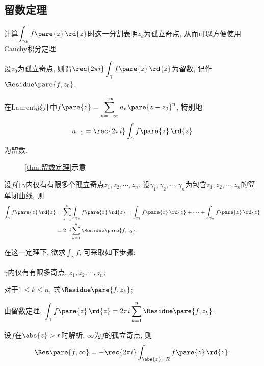\documentclass[../ComplexVariable.tex]{subfiles}
\begin{document}

\subsection{留数定理} %
\label{sub:留数定理}

计算$\displaystyle \int_{\gamma_k}f\pare{z}\,\rd{z}$时这一分割表明$z_k$为孤立奇点, 从而可以方便使用Cauchy积分定理.
\begin{definition}
    设$z_0$为孤立奇点, 则谓$\displaystyle \rec{2\pi i}\int_\gamma f\pare{z}\,\rd{z}$为留数, 记作$\Residue\pare{f,z_0}$.
\end{definition}
\begin{remark}
    在Laurent展开中$\displaystyle f\pare{z} = \sum_{n=-\infty}^{+\infty} a_n\pare{z-z_0}^n$, 特别地
    \[ a_{-1} = \rec{2\pi i} \int_{\gamma} f\pare{z}\,\rd{z} \]
    为留数.
\end{remark}
\begin{figure}[ht]
    \centering
    \caption{\cref{thm:留数定理}示意}
\end{figure}
\begin{theorem}[留数定理]
    \label{thm:留数定理}
    设$f$在$\gamma$内仅有有限多个孤立奇点$z_1, z_2, \cdots, z_n$. 设$\gamma_1,\gamma_2,\cdots,\gamma_n$为包含$z_1,z_2,\cdots,z_n$的简单闭曲线, 则
    \begin{align*}
        \int_\gamma f\pare{z}\,\rd{z} &= \sum_{k=1}^n \int_{\gamma_k} f\pare{z}\,\rd{z} = \int_{\gamma_1} f\pare{z}\,\rd{z} + \cdots + \int_{\gamma_n} f\pare{z}\,\rd{z} \\
        &= 2\pi i \sum_{k=1}^n \Residue\pare{f,z_0}.
    \end{align*}
\end{theorem}
在这一定理下, 欲求$\displaystyle \int_{\gamma} f$, 可采取如下步骤:
\begin{cenum}
    \item $\gamma$内仅有有限多奇点, $z_1, z_2, \cdots, z_n$;
    \item 对于$1\le k\le n$, 求$\Residue\pare{f,z_k}$;
    \item 由留数定理, $\displaystyle \int_\gamma f\pare{z}\,\rd{z} = 2\pi i \sum_{k=1}^n \Residue\pare{f,z_k}$.
\end{cenum}
\begin{definition}
    设$f$在$\abs{z}>r$时解析, $\infty$为$f$的孤立奇点, 则
    \[ \Res\pare{f,\infty} = -\rec{2\pi i} \int_{\abs{z}=R} f\pare{z}\,\rd{z}. \]
\end{definition}
\end{document}
